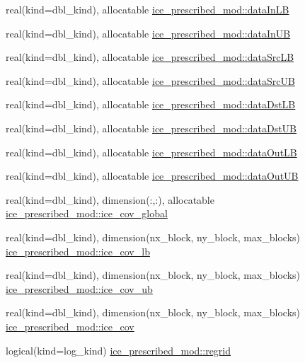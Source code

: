 \begin{DoxyCompactItemize}
\item 
real(kind=dbl\_\-kind), allocatable \hyperlink{namespaceice__prescribed__mod_a7b605d560be8c1903b0df4b66076f31a}{ice\_\-prescribed\_\-mod::dataInLB}
\item 
real(kind=dbl\_\-kind), allocatable \hyperlink{namespaceice__prescribed__mod_a07649c4c91bccc292f9aa60851ab2a14}{ice\_\-prescribed\_\-mod::dataInUB}
\item 
real(kind=dbl\_\-kind), allocatable \hyperlink{namespaceice__prescribed__mod_a14513a8e50e8321ddac9e3f9d091cd12}{ice\_\-prescribed\_\-mod::dataSrcLB}
\item 
real(kind=dbl\_\-kind), allocatable \hyperlink{namespaceice__prescribed__mod_a59169c4d93914baf69c59b8d5f2fb1ab}{ice\_\-prescribed\_\-mod::dataSrcUB}
\item 
real(kind=dbl\_\-kind), allocatable \hyperlink{namespaceice__prescribed__mod_a69b2adaed2ac02b269e8c3c1d6b44178}{ice\_\-prescribed\_\-mod::dataDstLB}
\item 
real(kind=dbl\_\-kind), allocatable \hyperlink{namespaceice__prescribed__mod_a07af024321e34db28532c6834a352da3}{ice\_\-prescribed\_\-mod::dataDstUB}
\item 
real(kind=dbl\_\-kind), allocatable \hyperlink{namespaceice__prescribed__mod_a88edf4fbb0dc86b082ddf6a6c48d393a}{ice\_\-prescribed\_\-mod::dataOutLB}
\item 
real(kind=dbl\_\-kind), allocatable \hyperlink{namespaceice__prescribed__mod_a0c216149ad3a2a7bd66c3bdb274c77e7}{ice\_\-prescribed\_\-mod::dataOutUB}
\item 
real(kind=dbl\_\-kind), dimension(:,:), allocatable \hyperlink{namespaceice__prescribed__mod_a2bc0b66d04bc6ff5ed1c325ee6292eff}{ice\_\-prescribed\_\-mod::ice\_\-cov\_\-global}
\item 
real(kind=dbl\_\-kind), dimension(nx\_\-block, ny\_\-block, max\_\-blocks) \hyperlink{namespaceice__prescribed__mod_a2f6a0d3d485195c75861395c78cc22aa}{ice\_\-prescribed\_\-mod::ice\_\-cov\_\-lb}
\item 
real(kind=dbl\_\-kind), dimension(nx\_\-block, ny\_\-block, max\_\-blocks) \hyperlink{namespaceice__prescribed__mod_a9c50464ba0a337c6fd03cec3a7338897}{ice\_\-prescribed\_\-mod::ice\_\-cov\_\-ub}
\item 
real(kind=dbl\_\-kind), dimension(nx\_\-block, ny\_\-block, max\_\-blocks) \hyperlink{namespaceice__prescribed__mod_ad870001a33c2597b961fde76bceca0b6}{ice\_\-prescribed\_\-mod::ice\_\-cov}
\item 
logical(kind=log\_\-kind) \hyperlink{namespaceice__prescribed__mod_a794e5c02618e82554dc2cec6c635b8f1}{ice\_\-prescribed\_\-mod::regrid}

\end{DoxyCompactItemize}
